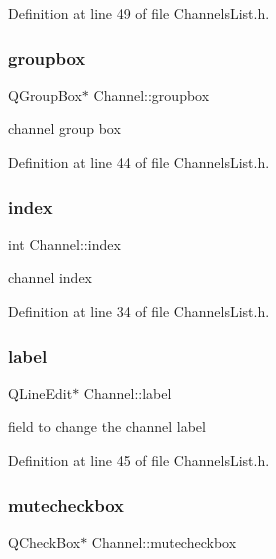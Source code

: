 Definition at line 49 of file Channels\+List.\+h.

\mbox{\label{class_channel_a99287738754d9e20c0ca639d6d26f28c}} 
\subsubsection{\texorpdfstring{groupbox}{groupbox}}
{\footnotesize\ttfamily Q\+Group\+Box$\ast$ Channel\+::groupbox}

channel group box 

Definition at line 44 of file Channels\+List.\+h.

\mbox{\label{class_channel_a992b8f195f395a64b4e966886bb41f00}} 
\subsubsection{\texorpdfstring{index}{index}}
{\footnotesize\ttfamily int Channel\+::index}

channel index 

Definition at line 34 of file Channels\+List.\+h.

\mbox{\label{class_channel_a66a7e30d0b8c6ee9c0b0d537b59bd695}} 
\subsubsection{\texorpdfstring{label}{label}}
{\footnotesize\ttfamily Q\+Line\+Edit$\ast$ Channel\+::label}

field to change the channel label 

Definition at line 45 of file Channels\+List.\+h.

\mbox{\label{class_channel_a0e7f90da49f291a7bac498e11e886fbd}} 
\subsubsection{\texorpdfstring{mutecheckbox}{mutecheckbox}}
{\footnotesize\ttfamily Q\+Check\+Box$\ast$ Channel\+::mutecheckbox}

